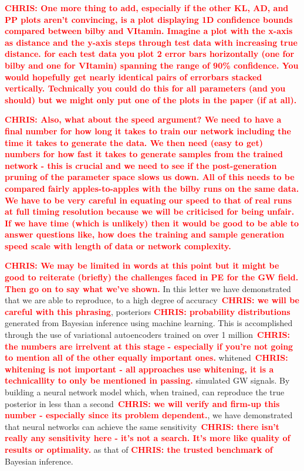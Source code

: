 \documentclass[%
showpacs,
 amsmath,amssymb,
 aps,
 twocolumn,
 prl,
 reprint,
floatfix,
]{revtex4-1}
\newcommand{\chris}[1]{\textbf{\textcolor{red}{CHRIS: #1}}}
\begin{document}
\chris{One more thing to add, especially if the other KL, AD, and PP plots
aren't convincing, is a plot displaying 1D confidence bounds compared between
bilby and VItamin. Imagine a plot with the x-axis as distance and the y-axis
steps through test data with increasing true distance. for each test data you
plot 2 error bars horizontally (one for bilby and one for VItamin) spanning the
range of 90\% confidence. You would hopefully get nearly identical pairs of
errorbars stacked vertically. Technically you could do this for all parameters
(and you should) but we might only put one of the plots in the paper (if at
all).}

\chris{Also, what about the speed argument? We need to have a final number for
how long it takes to train our network including the time it takes to generate
the data. We then need (easy to get) numbers for how fast it takes to generate
samples from the trained network - this is crucial and we need to see if the
post-generation pruning of the parameter space slows us down. All of this needs
to be compared fairly apples-to-apples with the bilby runs on the same data. We
have to be very careful in equating our speed to that of real runs at full
timing resolution because we will be criticised for being unfair. If we have
time (which is unlikely) then it would be good to be able to answer questions
like, how does the training and sample generation speed scale with length of
data or network complexity.}

%
%
\chris{We may be limited in words at this point but it might be good to
reiterate (briefly) the challenges faced in PE for the GW field. Then go on to
say what we've shown.} In this letter we have demonstrated that we are able to
reproduce, to a high degree of accuracy~\chris{we will be careful with this
phrasing}, posteriors \chris{probability distributions} generated from Bayesian
inference using machine learning. This is accomplished through the use of
variational autoencoders trained on over 1 million~\chris{the numbers are
irrelvent at this stage - especially if you're not going to mention all of the
other equally important ones.} whitened~\chris{whitening is not important - all
approaches use whitening, it is a technicallity to only be mentioned in
passing.} simulated \ac{GW} signals. By building a neural network model which,
when trained, can reproduce the true posterior in less than a second~\chris{we
will verify and firm-up this number - especially since its problem dependent.},
we have demonstrated that neural networks can achieve the same
sensitivity~\chris{there isn't really any sensitivity here - it's not a search.
It's more like quality of results or optimality.} as that of \chris{the trusted
benchmark of} Bayesian inference.
\end{document}
